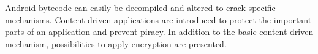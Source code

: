 Android bytecode can easily be decompiled and altered to crack specific mechanisms.
Content driven applications are introduced to protect the important parts of an application and prevent piracy.
\newline
In addition to the basic content driven mechanism, possibilities to apply encryption are presented.
